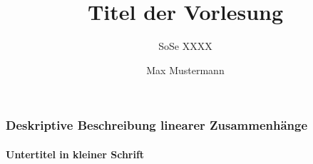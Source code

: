 \documentclass[hyperref={pdfpagelabels=false}]{beamer}
\title{Titel der Vorlesung}
\subtitle{SoSe XXXX}
\author{Max Mustermann}
\date{}
\begin{document}
\begin{frame}
\frametitle{Deskriptive Beschreibung linearer Zusammenhänge}
\framesubtitle{Untertitel in kleiner Schrift}
\end{frame}
\end{document}
